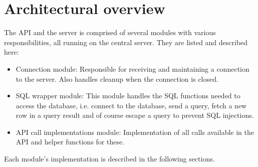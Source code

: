 \section{Architectural overview}
The API and the server is comprised of several modules with various responsibilities, all running on the central server. They are listed and described here:

\begin{itemize}
\item Connection module: Responsible for receiving and maintaining a connection to the server. Also handles cleanup when the connection is closed. 
\item SQL wrapper module: This module handles the SQL functions needed to access the database, i.e. connect to the database, send a query, fetch a new row in a query result and of course escape a query to prevent SQL injections.
\item API call implementations module: Implementation of all calls available in the API and helper functions for these. 
\end{itemize}

Each module's implementation is described in the following sections.